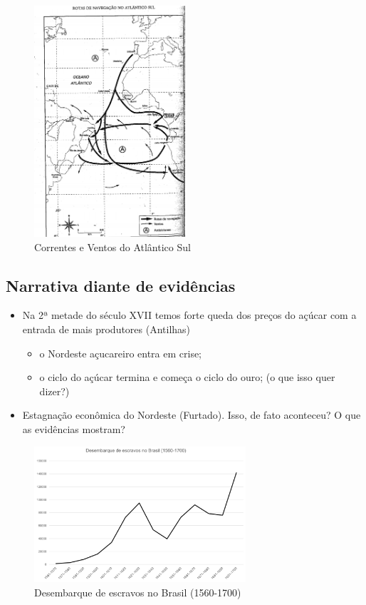 \documentclass[a4paper,12pt]{article}[abntex2]
\begin{document}
\begin{figure}[H]
    \centering
    \includegraphics[width=0.5\textwidth]{Imagens Slides/i1a2.png}
    \caption{Correntes e Ventos do Atlântico Sul}
\end{figure}

\subsection{\textbf{Narrativa diante de evidências}}

\begin{itemize}
    \item Na 2ª metade do século XVII temos forte queda dos preços do açúcar com a entrada de mais produtores (Antilhas) \begin{itemize}
        \item o Nordeste açucareiro entra em crise;
        \item o ciclo do açúcar termina e começa o ciclo do ouro; (o que isso quer dizer?)
    \end{itemize}
    \item Estagnação econômica do Nordeste (Furtado). Isso, de fato aconteceu? O que as evidências mostram?
\end{itemize}

\begin{figure}[H]
    \centering
    \includegraphics[width=0.7\textwidth]{Imagens Slides/i2a2.png}
    \caption{Desembarque de escravos no Brasil (1560-1700)}
\end{figure}
\end{document}
